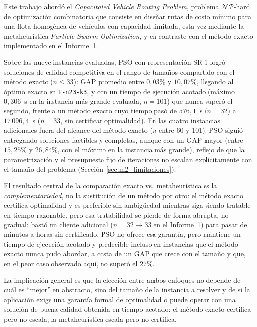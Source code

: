 
Este trabajo abordó el \textit{Capacitated Vehicle Routing Problem}, problema
$\mathcal{NP}$-hard de optimización combinatoria que consiste en diseñar rutas de costo
mínimo para una flota homogénea de vehículos con capacidad limitada, esta vez mediante
la metaheurística \textit{Particle Swarm Optimization}, y en contraste con el método
exacto implementado en el Informe~1.

Sobre las nueve instancias evaluadas, PSO con representación SR-1
\parencite{ai2009particle} logró soluciones de calidad competitiva en el rango de tamaños
compartido con el método exacto ($n\le33$): GAP promedio entre $0{,}03\%$ y $10{,}07\%$,
llegando al óptimo exacto en \texttt{E-n23-k3}, y con un tiempo de ejecución acotado
(máximo $0{,}306$~s en la instancia más grande evaluada, $n=101$) que nunca superó el
segundo, frente a un método exacto cuyo tiempo pasó de $576{,}1$~s ($n=32$) a
$17\,096{,}4$~s ($n=33$, sin certificar optimalidad). En las cuatro instancias
adicionales fuera del alcance del método exacto ($n$ entre 60 y 101), PSO siguió
entregando soluciones factibles y completas, aunque con un GAP mayor (entre $15{,}25\%$
y $26{,}84\%$, con el máximo en la instancia más grande), reflejo de que la
parametrización y el presupuesto fijo de iteraciones no escalan explícitamente con el
tamaño del problema (Sección~\ref{sec:m2_limitaciones}).

El resultado central de la comparación exacto vs.\ metaheurística es la
\textit{complementariedad}, no la sustitución de un método por otro: el método exacto
certifica optimalidad y es preferible sin ambigüedad mientras siga siendo tratable en
tiempo razonable, pero esa tratabilidad se pierde de forma abrupta, no gradual: bastó un
cliente adicional ($n=32\to33$ en el Informe~1) para pasar de minutos a horas sin
certificado. PSO no ofrece esa garantía, pero mantiene un tiempo de ejecución acotado y
predecible incluso en instancias que el método exacto nunca pudo abordar, a costa de un
GAP que crece con el tamaño y que, en el peor caso observado aquí, no superó el
$27\%$.

La implicación general es que la elección entre ambos enfoques no depende de cuál es
``mejor'' en abstracto, sino del tamaño de la instancia a resolver y de si la aplicación
exige una garantía formal de optimalidad o puede operar con una solución de buena
calidad obtenida en tiempo acotado: el método exacto certifica pero no escala; la
metaheurística escala pero no certifica.
